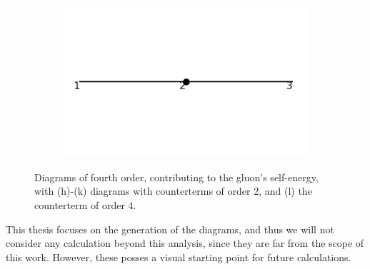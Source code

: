 \documentclass[11pt,a4paper,twoside,pdf]{article}
\numberwithin{equation}{section}
\begin{document}
\begin{figure}[h!]
\begin{subfigure}[t]{0.19\textwidth}
    \end{subfigure}
    \begin{subfigure}[t]{0.19\textwidth}
        \centering
        \includegraphics[width=\textwidth]{plots/order4_1to1/counterterms/6.png}
        \caption{ }
        
    \end{subfigure}

    \caption{Diagrams of fourth order, contributing to the gluon's self-energy,
    with (h)-(k) diagrams with counterterms of order 2, and (l) the counterterm 
    of order 4.}
    \label{fig:order4_1to1}
    
\end{figure}

This thesis focuses on the generation of the diagrams, and thus we will not
consider any calculation beyond this analysis, since
they are far from the scope of this work. However, these posses a visual 
starting point for future calculations.
\end{document}
